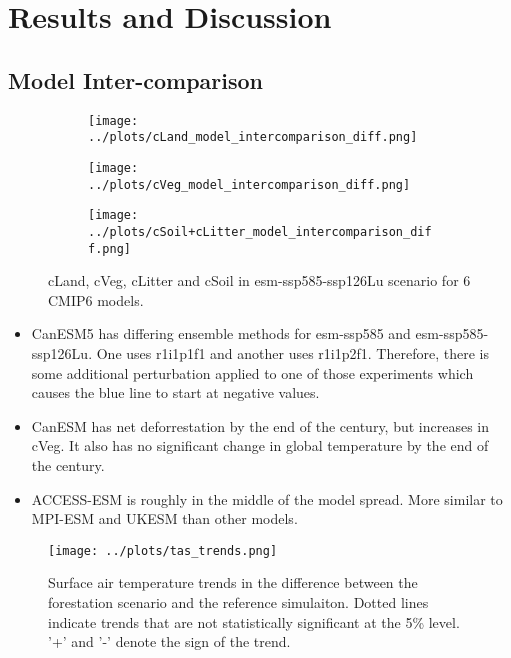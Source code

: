 \documentclass[]{article}
\begin{document}
\section{Results and Discussion}

\subsection{Model Inter-comparison}

\begin{figure}[H]
    \centering
    \begin{subfigure}[b]{0.45\linewidth}
        \texttt{[image: ../plots/cLand\_model\_intercomparison\_diff.png]}
    \end{subfigure}
    \begin{subfigure}[b]{0.45\linewidth}
        \texttt{[image: ../plots/cVeg\_model\_intercomparison\_diff.png]}
    \end{subfigure}
    \begin{subfigure}[b]{0.45\linewidth}
        \texttt{[image: ../plots/cSoil+cLitter\_model\_intercomparison\_diff.png]}
    \end{subfigure}
    \caption{cLand, cVeg, cLitter and cSoil in esm-ssp585-ssp126Lu scenario for 6 CMIP6 models.}
    \label{fig:models_cpools}
\end{figure}

\begin{itemize}
    \item CanESM5 has differing ensemble methods for esm-ssp585 and esm-ssp585-ssp126Lu. One uses r1i1p1f1 and another uses r1i1p2f1. Therefore, there is some additional perturbation applied to one of those experiments which causes the blue line to start at negative values.
    \item CanESM has net deforrestation by the end of the century, but increases in cVeg. It also has no significant change in global temperature by the end of the century.
    \item ACCESS-ESM is roughly in the middle of the model spread. More similar to MPI-ESM and UKESM than other models.
\end{itemize}

\begin{figure}[H]
    \centering
    \texttt{[image: ../plots/tas\_trends.png]}
    \caption{Surface air temperature trends in the difference between the forestation scenario and the reference simulaiton. Dotted lines indicate trends that are not statistically significant at the 5\% level. '+' and '-' denote the sign of the trend.}
    \label{fig:models_tas_trends}
\end{figure}
\end{document}
